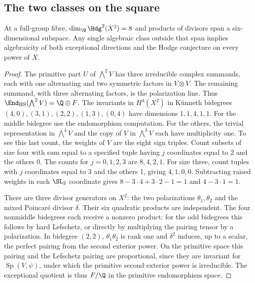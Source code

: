 \subsection{The two classes on the square}

\begin{proposition}\label{v7:prop:square}
At a full-group fibre, \(\dim_\Q \Hdg^2(X^2)=8\) and products of divisors span a six-dimensional subspace. Any single algebraic class outside that span implies algebraicity of both exceptional directions and the Hodge conjecture on every power of \(X\).
\end{proposition}
\begin{proof}
The primitive part \(U\) of \(\bigwedge^2 V\) has three irreducible complex summands, each with one alternating and two symmetric factors in \(V\otimes V\). The remaining summand, with three alternating factors, is the polarization line. Thus \(\End_{\mathrm{HS}}(\bigwedge^2 V)=\Q\oplus F\). The invariants in \(H^4(X^2)\) in K\"unneth bidegrees \((4,0),(3,1),(2,2),(1,3),(0,4)\) have dimensions \(1,1,4,1,1\). For the middle bidegree use the endomorphism computation. For the others, the trivial representation in \(\bigwedge^4 V\) and the copy of \(V\) in \(\bigwedge^3 V\) each have multiplicity one. To see this last count, the weights of \(V\) are the eight sign triples. Count subsets of size four with sum equal to a specified tuple having \(j\) coordinates equal to 2 and the others 0. The counts for \(j=0,1,2,3\) are \(8,4,2,1\). For size three, count tuples with \(j\) coordinates equal to 3 and the others 1, giving \(4,1,0,0\). Subtracting raised weights in each \(\SL_2\) coordinate gives \(8-3\cdot4+3\cdot2-1=1\) and \(4-3\cdot1=1\).

There are three divisor generators on \(X^2\): the two polarizations \(\theta_1,\theta_2\) and the mixed Poincar\'e divisor \(\delta\). Their six quadratic products are independent. The four nonmiddle bidegrees each receive a nonzero product: for the odd bidegrees this follows by hard Lefschetz, or directly by multiplying the pairing tensor by a polarization. In bidegree \((2,2)\), \(\theta_1\theta_2\) is rank one and \(\delta^2\) induces, up to a scalar, the perfect pairing from the second exterior power. On the primitive space this pairing and the Lefschetz pairing are proportional, since they are invariant for \(\operatorname{Sp}(V,\psi)\), under which the primitive second exterior power is irreducible. The exceptional quotient is thus \(F/\Q\) in the primitive endomorphism space.


\end{proof}
